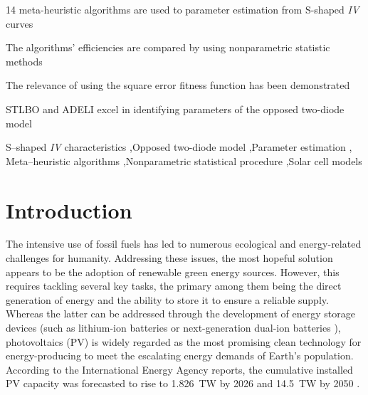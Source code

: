\documentclass[a4paper,fleqn]{cas-sc}
\begin{document}
\begin{highlights}
\item 14 meta-heuristic algorithms are used to parameter estimation from S-shaped \emph{IV} curves
\item The algorithms' efficiencies are compared by using nonparametric statistic methods
\item The relevance of using the square error fitness function has been demonstrated
\item STLBO and ADELI excel in identifying parameters of the opposed two-diode model
\end{highlights}


\begin{keywords}
S--shaped \emph{IV} characteristics \sep Opposed two-diode model \sep Parameter estimation \sep
Meta--heuristic algorithms \sep Nonparametric statistical procedure \sep Solar cell models
\end{keywords}

\maketitle

\section{Introduction}\label{Int}




The intensive use of fossil fuels has led to numerous ecological and energy-related challenges for humanity.
Addressing these issues, the most hopeful solution appears to be the adoption of renewable green energy sources.
However, this requires tackling several key tasks,
the primary among them being the direct generation of energy and the ability to store it to ensure a reliable supply.
Whereas the latter can be addressed through the development of energy storage devices
(such as lithium-ion batteries or next-generation dual-ion batteries  \cite{Zhang2024,Wang2018,Zhang2016}),
photovoltaics (PV) is widely regarded as the most promising clean technology for energy-producing
to meet the escalating energy demands of Earth's population.
According to the International Energy Agency reports,
the cumulative installed PV capacity was forecasted to rise to 1.826~TW by 2026 and 14.5~TW by 2050 \cite{Wang2022}.
\end{document}
